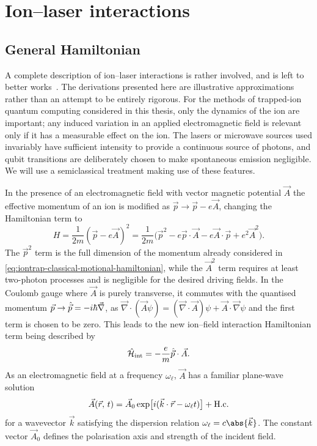 \section{Ion--laser interactions}
\label{sec:iontrap-interaction}

\subsection{General Hamiltonian}

A complete description of ion--laser interactions is rather involved, and is left to better works~\cite{Woodgate1980,Bransden1983,Loudon2000}.
The derivations presented here are illustrative approximations rather than an attempt to be entirely rigorous.
For the methods of trapped-ion quantum computing considered in this thesis, only the dynamics of the ion are important; any induced variation in an applied electromagnetic field is relevant only if it has a measurable effect on the ion.
The lasers or microwave sources used invariably have sufficient intensity to provide a continuous source of photons, and qubit transitions are deliberately chosen to make spontaneous emission negligible.
We will use a semiclassical treatment making use of these features.

In the presence of an electromagnetic field with vector magnetic potential $\vec A$ the effective momentum of an ion is modified as $\vec p\to\vec p - e\vec A$, changing the Hamiltonian term to
\begin{equation}
H = \frac1{2m}{(\vec p - e\vec A)}^2
  = \frac1{2m}\bigl(\vec p^2 - e\vec p\cdot\vec A - e\vec A\cdot\vec p + e^2\vec A^2\bigr).
\end{equation}
The $\vec p^2$ term is the full dimension of the momentum already considered in \cref{eq:iontrap-classical-motional-hamiltonian}, while the $\vec A^2$ term requires at least two-photon processes and is negligible for the desired driving fields.
In the Coulomb gauge where $\vec A$ is purely transverse, it commutes with the quantised momentum $\vec p\to\hat{\vec p}=-i\hbar\vec\nabla$, as $\vec\nabla\cdot(\vec A\psi) = (\vec\nabla\cdot\vec A)\psi + \vec A\cdot\vec\nabla\psi$ and the first term is chosen to be zero.
This leads to the new ion--field interaction Hamiltonian term being described by
\begin{equation}
\hat{\mathcal H}_{\text{int}} = -\frac em\hat{\vec p}\cdot\vec A.
\end{equation}
As an electromagnetic field at a frequency $\omega_\ell$, $\vec A$ has a familiar plane-wave solution
\begin{equation}
\vec A(\vec r,\,t) = \vec A_0 \exp\bigl[i(\vec k\cdot\vec r - \omega_\ell t)\bigr] + \text{H.c.}
\end{equation}
for a wavevector $\vec k$ satisfying the dispersion relation $\omega_\ell = c\abs{\vec k}$.
The constant vector $\vec A_0$ defines the polarisation axis and strength of the incident field.

